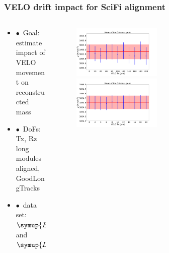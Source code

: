 \documentclass[aspectratio=1610, 12pt, xcolor=dvipsnames]{beamer}
\begin{document}
\begin{frame}\frametitle{VELO drift impact for SciFi alignment}
  \begin{columns}
    \begin{column}[c]{0.48\textwidth}
      \begin{itemize}
        \item $\bullet$\, Goal: estimate impact of VELO movement on reconstructed mass
        \item $\bullet$\, DoFs: Tx, Rz long modules aligned, GoodLongTracks
        \item $\bullet$\, data set: $\symup{B}_0 \to D^{*}\pi$ and $\symup{D}_0 \to \symup{K}\pi$
      \end{itemize}
    \end{column}
    \begin{column}[c]{0.48\textwidth}
      \begin{figure}
        \includegraphics[width=0.5\textwidth]{reading_material/current_stuff/velo_drift_plots/plots/D0_massvalue_smallVPTx.png}
        \includegraphics[width=0.5\textwidth]{reading_material/current_stuff/velo_drift_plots/plots/D0_massvalue_largeVPTx.png}
      \end{figure}
    \end{column}
  \end{columns}
\end{frame}
\end{document}

